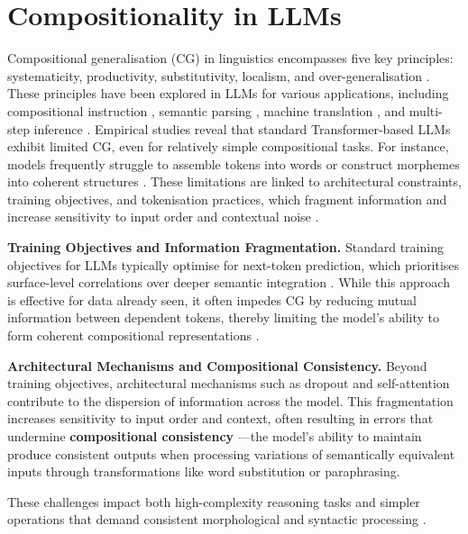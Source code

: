 \section{Compositionality in LLMs}\label{sec:compositionality}
Compositional generalisation (CG) in linguistics encompasses five key principles: systematicity, productivity, substitutivity, localism, and over-generalisation \cite{dankers-etal-2022-paradox}. These principles have been explored in LLMs for various applications, including compositional instruction \cite{yang2024exploring}, semantic parsing \cite{li-etal-2023-learning}, machine translation \cite{li-etal-2021-compositional}, and multi-step inference \cite{zhang2024can}. Empirical studies reveal that standard Transformer-based LLMs exhibit limited CG, even for relatively simple compositional tasks. For instance, models frequently struggle to assemble tokens into words or construct morphemes into coherent structures \cite{aljaafari2024interpreting, ismayilzada2024evaluating}. These limitations are linked to architectural constraints, training objectives, and tokenisation practices, which fragment information and increase sensitivity to input order and contextual noise \cite{murty-etal-2023-pushdown}. 

\textbf{Training Objectives and Information Fragmentation.} Standard training objectives for LLMs typically optimise for next-token prediction, which prioritises surface-level correlations over deeper semantic integration \cite{dziri2024faith}. While this approach is effective for data already seen, it often impedes CG by reducing mutual information between dependent tokens, thereby limiting the model's ability to form coherent compositional representations \cite{aljaafari2024interpreting}.

\textbf{Architectural Mechanisms and Compositional Consistency.} Beyond training objectives, architectural mechanisms such as dropout and self-attention contribute to the dispersion of information across the model. This fragmentation increases sensitivity to input order and context, often resulting in errors that undermine \textbf{compositional consistency} \cite{sajjadi2016regularization, cai2021isotropy}—the model's ability to maintain produce consistent outputs when processing variations of semantically equivalent inputs through transformations like word substitution or paraphrasing.

These challenges impact both high-complexity reasoning tasks and simpler operations that demand consistent morphological and syntactic processing \cite{ismayilzada2024evaluating}.

